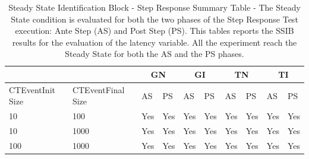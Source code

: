 \begin{table}[h]
\centering
\scriptsize

\begin{tabular}{ll|l|l|l|l|l|l|l|l|}
\cline{3-10}
                                       &                   & \multicolumn{2}{c|}{GN} & \multicolumn{2}{c|}{GI} & \multicolumn{2}{c|}{TN} & \multicolumn{2}{c|}{TI} \\ \hline
\multicolumn{1}{|l|}{CTEventInit Size} & CTEventFinal Size & AS         & PS         & AS         & PS         & AS         & PS         & AS         & PS         \\ \hline
\multicolumn{1}{|l|}{10}               & 100               & Yes        & Yes        & Yes        & Yes        & Yes        & Yes        & Yes        & Yes        \\ \hline
\multicolumn{1}{|l|}{10}               & 1000              & Yes        & Yes        & Yes        & Yes        & Yes        & Yes        & Yes        & Yes        \\ \hline
\multicolumn{1}{|l|}{100}              & 1000              & Yes        & Yes        & Yes        & Yes        & Yes        & Yes        & Yes        & Yes        \\ \hline
\end{tabular}
\caption[Steady State Identification Block - Step Response Summary Table - Latency]{Steady State Identification Block - Step Response Summary Table - The Steady State condition is evaluated for both the two phases of the Step Response Test execution: Ante Step (AS) and Post Step (PS). This tables reports the SSIB results for the evaluation of the latency variable. All the experiment reach the Steady State for both the AS and the PS phases.}
\label{tab:ss-step-latency}
\end{table}

